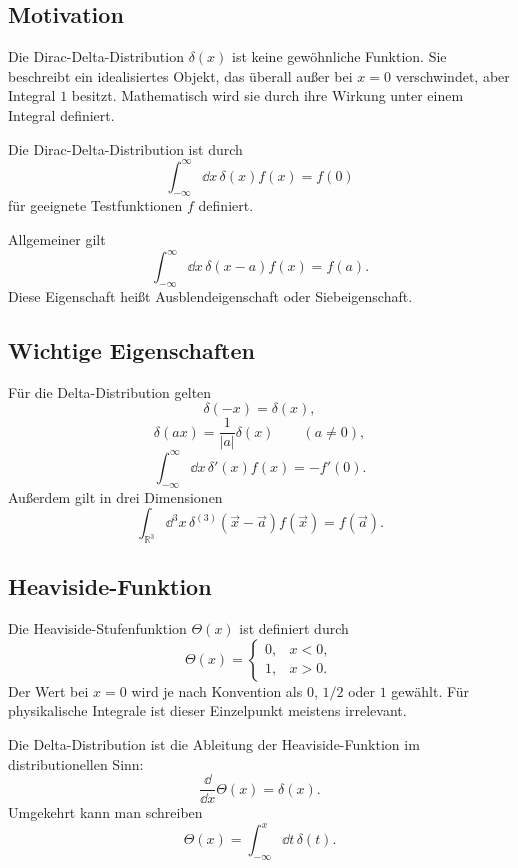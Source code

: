 \subsection{Motivation}

Die Dirac-Delta-Distribution $\delta(x)$ ist keine gewöhnliche Funktion. Sie beschreibt ein idealisiertes Objekt, das überall außer bei $x=0$ verschwindet, aber Integral $1$ besitzt. Mathematisch wird sie durch ihre Wirkung unter einem Integral definiert.

\begin{definitionbox}
Die Dirac-Delta-Distribution ist durch
\[
    \int_{-\infty}^{\infty}\dd x\,\delta(x)f(x)=f(0)
\]
für geeignete Testfunktionen $f$ definiert.
\end{definitionbox}

Allgemeiner gilt
\[
    \int_{-\infty}^{\infty}\dd x\,\delta(x-a)f(x)=f(a).
\]
Diese Eigenschaft heißt Ausblendeigenschaft oder Siebeigenschaft.

\subsection{Wichtige Eigenschaften}

\begin{formulabox}
Für die Delta-Distribution gelten
\[
    \delta(-x)=\delta(x),
\]
\[
    \delta(ax)=\frac{1}{|a|}\delta(x)\qquad (a\ne0),
\]
\[
    \int_{-\infty}^{\infty}\dd x\,\delta'(x)f(x)=-f'(0).
\]
Außerdem gilt in drei Dimensionen
\[
    \int_{\mathbb{R}^3}\dd^3x\,\delta^{(3)}(\vec x-\vec a)f(\vec x)=f(\vec a).
\]
\end{formulabox}

\subsection{Heaviside-Funktion}

Die Heaviside-Stufenfunktion $\Theta(x)$ ist definiert durch
\[
    \Theta(x)=
    \begin{cases}
        0, & x<0,\\
        1, & x>0.
    \end{cases}
\]
Der Wert bei $x=0$ wird je nach Konvention als $0$, $1/2$ oder $1$ gewählt. Für physikalische Integrale ist dieser Einzelpunkt meistens irrelevant.

Die Delta-Distribution ist die Ableitung der Heaviside-Funktion im distributionellen Sinn:
\[
    \frac{\dd}{\dd x}\Theta(x)=\delta(x).
\]
Umgekehrt kann man schreiben
\[
    \Theta(x)=\int_{-\infty}^{x}\dd t\,\delta(t).
\]

